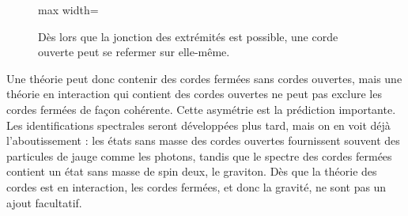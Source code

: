\begin{figure}[H]
  \centering
  \begin{adjustbox}{max width=\linewidth}
  \end{adjustbox}
  \caption{Dès lors que la jonction des extrémités est possible, une corde ouverte peut se refermer sur elle-même.}
  \label{fig:l02-closed-redraw}
\end{figure}

Une théorie peut donc contenir des cordes fermées sans cordes ouvertes, mais une théorie en interaction qui contient des cordes ouvertes ne peut pas exclure les cordes fermées de façon cohérente. Cette asymétrie est la prédiction importante. Les identifications spectrales seront développées plus tard, mais on en voit déjà l’aboutissement : les états sans masse des cordes ouvertes fournissent souvent des particules de jauge comme les photons, tandis que le spectre des cordes fermées contient un état sans masse de spin deux, le graviton. Dès que la théorie des cordes est en interaction, les cordes fermées, et donc la gravité, ne sont pas un ajout facultatif.
